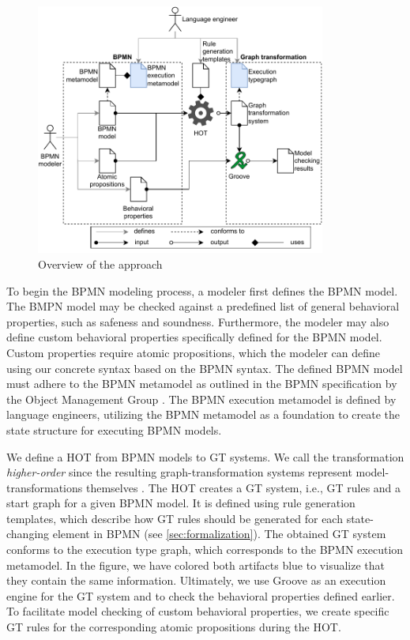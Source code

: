 \documentclass{lmcs} %
\begin{document}
\begin{figure}[ht]
    \centering
    \includegraphics[width=0.85\textwidth]{images/bpmn_semantics-overview.pdf}
    \caption{Overview of the approach}
    \label{fig:approach}
\end{figure}

To begin the BPMN modeling process, a modeler first defines the BPMN model. 
The BMPN model may be checked against a predefined list of general behavioral properties, such as safeness and soundness.
Furthermore, the modeler may also define custom behavioral properties specifically defined for the BPMN model.
Custom properties require atomic propositions, which the modeler can define using our concrete syntax based on the BPMN syntax.
The defined BPMN model must adhere to the BPMN metamodel as outlined in the BPMN specification by the Object Management Group \cite{objectmanagementgroupBusinessProcessModel2013}.
The BPMN execution metamodel is defined by language engineers, utilizing the BPMN metamodel as a foundation to create the state structure for executing BPMN models. 

We define a HOT from BPMN models to GT systems.
We call the transformation \textit{higher-order} since the resulting graph-transformation systems represent model-transformations themselves \cite{tisiUseHigherOrderModel2009}.
The HOT creates a GT system, i.e., GT rules and a start graph for a given BPMN model.
It is defined using rule generation templates, which describe how GT rules should be generated for each state-changing element in BPMN (see \autoref{sec:formalization}).
The obtained GT system conforms to the execution type graph, which corresponds to the BPMN execution metamodel.
In the figure, we have colored both artifacts blue to visualize that they contain the same information.
Ultimately, we use Groove as an execution engine for the GT system and to check the behavioral properties defined earlier.
To facilitate model checking of custom behavioral properties, we create specific GT rules for the corresponding atomic propositions during the HOT.
\end{document}
